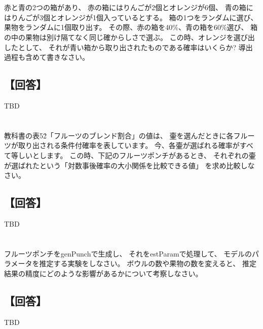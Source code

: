 \documentclass[a4j]{jarticle}
\begin{document}
\section{}
赤と青の2つの箱があり、
赤の箱にはりんごが2個とオレンジが6個、
青の箱にはりんごが3個とオレンジが1個入っているとする。
箱の1つをランダムに選び、果物をランダムに1個取り出す。
その際、赤の箱を40\%、青の箱を60\%選び、
箱の中の果物は別け隔てなく同じ確からしさで選ぶ。
この時、オレンジを選び出したとして、
それが青い箱から取り出されたものである確率はいくらか?
導出過程も含めて書きなさい。

\subsection{【回答】}
TBD

\section{}
教科書の表5\.2「フルーツのブレンド割合」の値は、
壷を選んだときに各フルーツが取り出される条件付確率を表しています。
今、各壷が選ばれる確率がすべて等しいとします。
この時、下記のフルーツポンチがあるとき、
それぞれの壷が選ばれたという「対数事後確率の大小関係を比較できる値」
を求め比較しなさい。

\subsection{【回答】}
TBD

\section{}
フルーツポンチをgenPunchで生成し、
それをestParamで処理して、
モデルのパラメータを推定する実験をしなさい。
ボウルの数や果物の数を変えると、
推定結果の精度にどのような影響があるかについて考察しなさい。

\subsection{【回答】}
TBD
\end{document}

